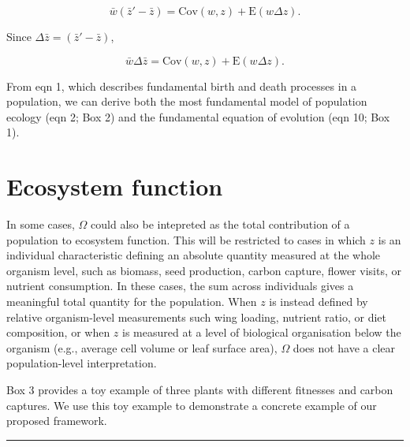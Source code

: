 \documentclass[
]{article}
\begin{document}
\[\bar{w}\left(\bar{z}' - \bar{z}\right) = \mathrm{Cov}\left(w ,z \right) + \mathrm{E}\left( w \Delta z  \right).\]

Since \(\Delta \bar{z} = \left(\bar{z}' - \bar{z}\right)\),

\[\bar{w}\Delta \bar{z} = \mathrm{Cov}\left(w ,z \right) + \mathrm{E}\left( w \Delta z  \right).
\tag{10}
\]

From eqn 1, which describes fundamental birth and death processes in a
population, we can derive both the most fundamental model of population
ecology (eqn 2; Box 2) and the fundamental equation of evolution (eqn
10; Box 1).

\section{Ecosystem function}\label{ecosystem-function}

In some cases, \(\Omega\) could also be intepreted as the total
contribution of a population to ecosystem function. This will be
restricted to cases in which \(z\) is an individual characteristic
defining an absolute quantity measured at the whole organism level, such
as biomass, seed production, carbon capture, flower visits, or nutrient
consumption. In these cases, the sum across individuals gives a
meaningful total quantity for the population. When \(z\) is instead
defined by relative organism-level measurements such wing loading,
nutrient ratio, or diet composition, or when \(z\) is measured at a
level of biological organisation below the organism (e.g., average cell
volume or leaf surface area), \(\Omega\) does not have a clear
population-level interpretation.

Box 3 provides a toy example of three plants with different fitnesses
and carbon captures. We use this toy example to demonstrate a concrete
example of our proposed framework.

\begin{center}\rule{0.5\linewidth}{0.5pt}\end{center}
\end{document}
